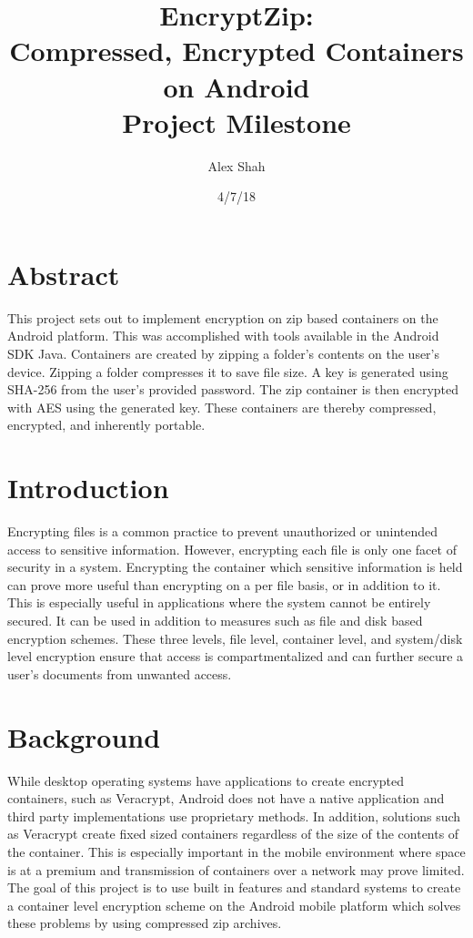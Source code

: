 \documentclass[10pt,a4paper]{article}
\begin{document}
\title{EncryptZip: \\ Compressed, Encrypted Containers on Android \\ Project Milestone}
\author{Alex Shah}
\date{4/7/18}

\maketitle

\section{Abstract}
This project sets out to implement encryption on zip based containers on the Android platform. This was accomplished with tools available in the Android SDK Java. Containers are created by zipping a folder's contents on the user's device. Zipping a folder compresses it to save file size. A key is generated using SHA-256 from the user's provided password. The zip container is then encrypted with AES using the generated key. These containers are thereby compressed, encrypted, and inherently portable.

\section{Introduction}
Encrypting files is a common practice to prevent unauthorized or unintended access to sensitive information. However, encrypting each file is only one facet of security in a system. Encrypting the container which sensitive information is held can prove more useful than encrypting on a per file basis, or in addition to it. This is especially useful in applications where the system cannot be entirely secured. It can be used in addition to measures such as file and disk based encryption schemes. These three levels, file level, container level, and system/disk level encryption ensure that access is compartmentalized and can further secure a user's documents from unwanted access. 

\section{Background}
While desktop operating systems have applications to create encrypted containers, such as Veracrypt, Android does not have a native application and third party implementations use proprietary methods. In addition, solutions such as Veracrypt create fixed sized containers regardless of the size of the contents of the container. This is especially important in the mobile environment where space is at a premium and transmission of containers over a network may prove limited. The goal of this project is to use built in features and standard systems to create a container level encryption scheme on the Android mobile platform which solves these problems by using compressed zip archives.
\end{document}
